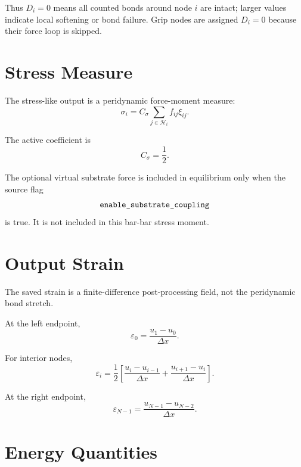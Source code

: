 \documentclass[11pt]{article}
\newcommand{\code}[1]{\texttt{\detokenize{#1}}}
\begin{document}
Thus \(D_i=0\) means all counted bonds around node \(i\) are intact; larger
values indicate local softening or bond failure. Grip nodes are assigned
\(D_i=0\) because their force loop is skipped.

\section{Stress Measure}

The stress-like output is a peridynamic force-moment measure:
\begin{equation}
    \sigma_i
    =
    C_\sigma
    \sum_{j\in\mathcal{H}_i}
    f_{ij}\xi_{ij}.
\end{equation}

The active coefficient is
\begin{equation}
    C_\sigma=\frac{1}{2}.
\end{equation}

The optional virtual substrate force is included in equilibrium only when the
source flag
\begin{equation}
    \code{enable_substrate_coupling}
\end{equation}
is true. It is not included in this bar-bar stress moment.

\section{Output Strain}

The saved strain is a finite-difference post-processing field, not the
peridynamic bond stretch.

At the left endpoint,
\begin{equation}
    \varepsilon_0 =
    \frac{u_1-u_0}{\Delta x}.
\end{equation}

For interior nodes,
\begin{equation}
    \varepsilon_i
    =
    \frac{1}{2}
    \left[
        \frac{u_i-u_{i-1}}{\Delta x}
        +
        \frac{u_{i+1}-u_i}{\Delta x}
    \right].
\end{equation}

At the right endpoint,
\begin{equation}
    \varepsilon_{N-1}
    =
    \frac{u_{N-1}-u_{N-2}}{\Delta x}.
\end{equation}

\section{Energy Quantities}
\end{document}
